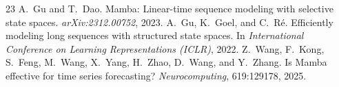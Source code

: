 \documentclass[10pt]{article}
\begin{document}
\begin{thebibliography}{23}
 A.~Gu and T.~Dao. Mamba: Linear-time sequence modeling with selective state spaces. \emph{arXiv:2312.00752}, 2023.
 A.~Gu, K.~Goel, and C.~R\'e. Efficiently modeling long sequences with structured state spaces. In \emph{International Conference on Learning Representations (ICLR)}, 2022.
 Z.~Wang, F.~Kong, S.~Feng, M.~Wang, X.~Yang, H.~Zhao, D.~Wang, and Y.~Zhang. Is Mamba effective for time series forecasting? \emph{Neurocomputing}, 619:129178, 2025.
\end{thebibliography}
\end{document}
